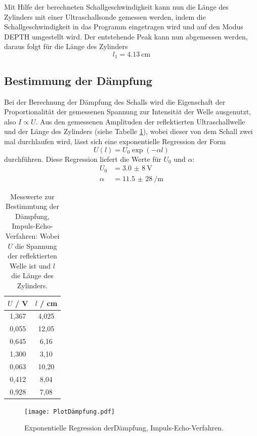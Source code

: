 Mit Hilfe der berechneten Schallgeschwindigkeit kann nun die Länge des Zylinders mit einer Ultraschallsonde gemessen werden, indem die Schallgeschwindigkeit in
das Programm eingetragen wird und auf den Modus DEPTH umgestellt wird. Der entstehende Peak kann nun abgemessen werden, daraus folgt für die Länge des Zylinders
\begin{equation*}
  l_1 = \SI{4,13}{\centi\meter}
\end{equation*}

\subsection{Bestimmung der Dämpfung}
Bei der Berechnung der Dämpfung des Schalls wird die Eigenschaft der Proportionalität der gemessenen Spannung zur Intensität der Welle ausgenutzt, also
$I \propto U$. Aus den gemessenen Amplituden der reflektierten Ultraschallwelle und der Länge des Zylinders (siehe Tabelle \ref{tab:2}), wobei dieser
von dem Schall zwei mal durchlaufen wird, lässt sich eine exponentielle Regression der Form
\begin{equation*}
  U(l) = U_0 \exp(-\alpha l)
\end{equation*}
durchführen. Diese Regression liefert die Werte für $U_0$ und $\alpha$:
\begin{align*}
  U_0 &= \SI{3,0(8)}{\volt} \\
  \alpha &= \SI{11,5(28)}{\per\meter}
\end{align*}
\begin{table}
  \centering
  \caption{Messwerte zur Bestimmtung der Dämpfung, Impuls-Echo-Verfahren: Wobei $U$ die Spannung der reflektierten Welle ist und $l$ die Länge des Zylinders.}
  \label{tab:2}
  \begin{tabular}{c c}
    \toprule
    $U$ / \si{\volt} & $l$ / \si{\centi\meter} \\
    \midrule
     1,367 & 4,025 \\
     0,055 & 12,05 \\
     0,645 & 6,16 \\
     1,300 & 3,10 \\
     0,063 & 10,20 \\
     0,412 & 8,04 \\
     0,928 & 7,08  \\
    \bottomrule
  \end{tabular}
\end{table}
\begin{figure}
  \centering
  \texttt{[image: PlotDämpfung.pdf]}
  \caption{Exponentielle Regression derDämpfung, Impuls-Echo-Verfahren.}
  \label{abb:2}
\end{figure}


